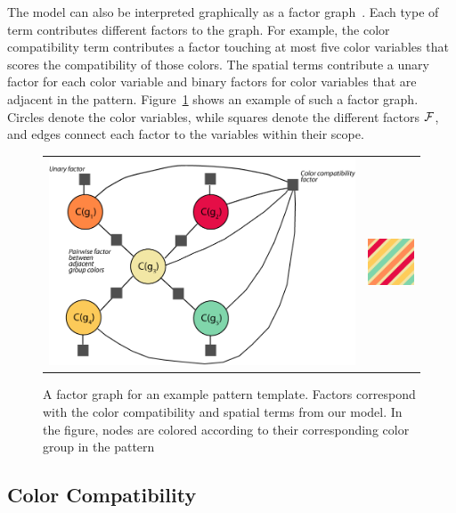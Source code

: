 The model can also be interpreted graphically as a factor graph~\cite{FactorGraphs}. Each type of term contributes different factors to the graph. For example, the color compatibility term contributes a factor touching at most five color variables that scores the compatibility of those colors. The spatial terms contribute a unary factor for each color variable and binary factors for color variables that are adjacent in the pattern. Figure~\ref{fig:FactorGraph} shows an example of such a factor graph. Circles denote the color variables, while squares denote the different factors $\mathcal{F}$, and edges connect each factor to the variables within their scope. 


\begin{figure}[ht]
\begin{tabular}{cc}
\includegraphics[width=.7\columnwidth]{figs/factorGraph} & \includegraphics[width=.2\columnwidth]{figs/factorGraphPattern}\\
\end{tabular} 
\caption{A factor graph for an example pattern template. Factors correspond with the color compatibility and spatial terms from our model. In the figure, nodes are colored according to their corresponding color group in the pattern}
\label{fig:FactorGraph}
\end{figure}



\subsection{Color Compatibility}
\label{sec:colorCompat}

